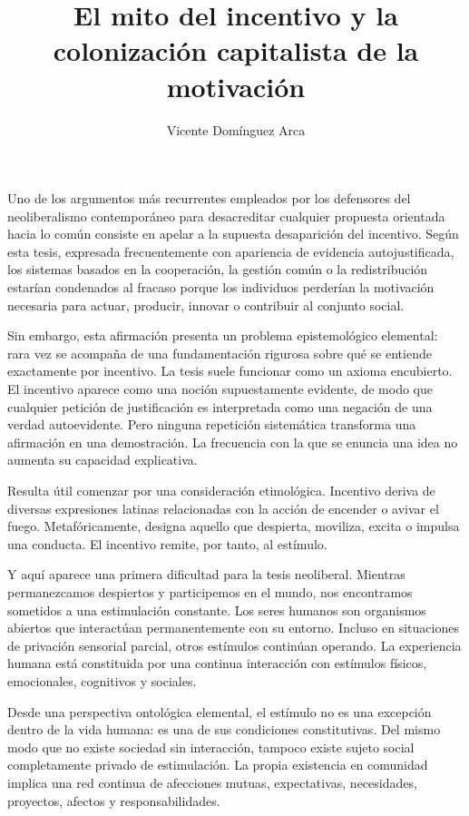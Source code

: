 \documentclass[11pt,a4paper]{article}
\title{El mito del incentivo y la colonización capitalista de la motivación}
\author{Vicente Domínguez Arca}
\date{}
\begin{document}
\maketitle

Uno de los argumentos más recurrentes empleados por los defensores del neoliberalismo contemporáneo para desacreditar cualquier propuesta orientada hacia lo común consiste en apelar a la supuesta desaparición del incentivo. Según esta tesis, expresada frecuentemente con apariencia de evidencia autojustificada, los sistemas basados en la cooperación, la gestión común o la redistribución estarían condenados al fracaso porque los individuos perderían la motivación necesaria para actuar, producir, innovar o contribuir al conjunto social.

Sin embargo, esta afirmación presenta un problema epistemológico elemental: rara vez se acompaña de una fundamentación rigurosa sobre qué se entiende exactamente por incentivo. La tesis suele funcionar como un axioma encubierto. El incentivo aparece como una noción supuestamente evidente, de modo que cualquier petición de justificación es interpretada como una negación de una verdad autoevidente. Pero ninguna repetición sistemática transforma una afirmación en una demostración. La frecuencia con la que se enuncia una idea no aumenta su capacidad explicativa.

Resulta útil comenzar por una consideración etimológica. Incentivo deriva de diversas expresiones latinas relacionadas con la acción de encender o avivar el fuego. Metafóricamente, designa aquello que despierta, moviliza, excita o impulsa una conducta. El incentivo remite, por tanto, al estímulo.

Y aquí aparece una primera dificultad para la tesis neoliberal. Mientras permanezcamos despiertos y participemos en el mundo, nos encontramos sometidos a una estimulación constante. Los seres humanos son organismos abiertos que interactúan permanentemente con su entorno. Incluso en situaciones de privación sensorial parcial, otros estímulos continúan operando. La experiencia humana está constituida por una continua interacción con estímulos físicos, emocionales, cognitivos y sociales.

Desde una perspectiva ontológica elemental, el estímulo no es una excepción dentro de la vida humana: es una de sus condiciones constitutivas. Del mismo modo que no existe sociedad sin interacción, tampoco existe sujeto social completamente privado de estimulación. La propia existencia en comunidad implica una red continua de afecciones mutuas, expectativas, necesidades, proyectos, afectos y responsabilidades.
\end{document}
